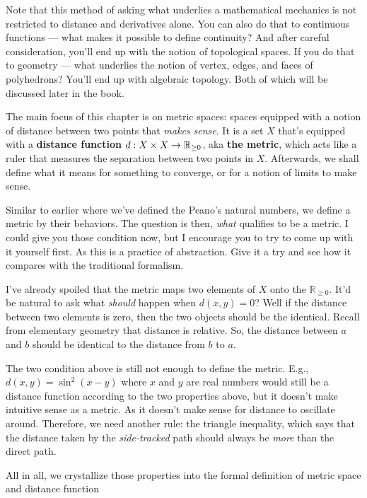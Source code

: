 Note that this method of asking what underlies a mathematical mechanics is not
restricted to distance and derivatives alone. You can also do that to continuous
functions --- what makes it possible to define continuity? And after careful
consideration, you'll end up with the notion of topological spaces. If you do that
to geometry --- what underlies the notion of vertex, edges, and faces of polyhedrons?
You'll end up with algebraic topology. Both of which will be discussed later in the book.

The main focus of this chapter is on metric spaces: spaces equipped with a notion of
distance between two points that \emph{makes sense}. It is a set \(X\) that's equipped
with a \textbf{distance function} \(d: X \times X \rightarrow \mathbb{R}_{\geq 0}\), aka \textbf{the
metric}, which acts like a ruler that measures the separation between two points in \(X\).
Afterwards, we shall define what it means for something to converge, or for a notion
of limits to make sense.

Similar to earlier where we've defined the Peano's natural numbers, we define a metric by their
behaviors. The question is then, \emph{what} qualifies to be a metric. I could give you those
condition now, but I encourage you to try to come up with it yourself first. As this is a practice
of abstraction. Give it a try and see how it compares with the traditional formalism.

I've already spoiled that the metric maps two elements of \(X\) onto the \(\mathbb{R}_{\geq 0}\).
It'd be natural to ask what \emph{should} happen when \(d(x, y) = 0\)? Well if the
distance between two elements is zero, then the two objects should be the identical.
Recall from elementary geometry that distance is relative. So, the distance between
\(a\) and \(b\) should be identical to the distance from \(b\) to \(a\).

The two condition above is still not enough to define the metric. E.g., \(d(x, y) = \sin^2(x - y)\)
where \(x\) and \(y\) are real numbers would still be a distance function according
to the two properties above, but it doesn't make intuitive sense as a metric. As it
doesn't make sense for distance to oscillate around. Therefore, we need another rule:
the triangle inequality, which says that the distance taken by the \emph{side-tracked}
path should always be \emph{more} than the direct path.

All in all, we crystallize those properties into the formal definition of metric space
and distance function


